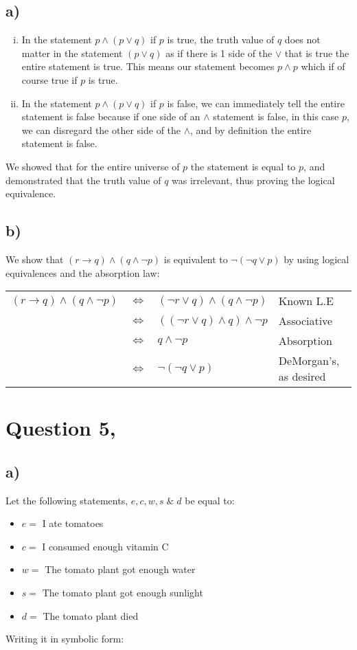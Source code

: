 \documentclass{article}
\begin{document}
\subsection*{a)}
\begin{enumerate}[i)]
    \item In the statement $p \land (p \lor q)$ if $p$ is true, the truth value of $q$ does not matter in the statement $(p\lor q)$ as if there is 1 side of the $\lor$ that is true the entire statement is true. This means our statement becomes $p \land p$ which if of course true if $p$ is true.
    \item In the statement $p \land (p \lor q)$ if $p$ is false, we can immediately tell the entire statement is false because if one side of an $\land$ statement is false, in this case $p$, we can disregard the other side of the $\land$, and by definition the entire statement is false.
\end{enumerate}
We showed that for the entire universe of $p$ the statement is equal to $p$, and demonstrated that the truth value of $q$ was irrelevant, thus proving the logical equivalence. 
\subsection*{b)}
We show that $(r\rightarrow q) \land (q \land \lnot p)$ is equivalent to $\lnot(\lnot q \lor p)$ by using logical equivalences and the absorption law:

\begin{table}[htp]
    \centering
    \begin{tabular}{ccll}
        $(r\rightarrow q) \land (q \land \lnot p)$ & $\Leftrightarrow$ & $(\lnot r\lor q) \land (q \land \lnot p)$ & Known L.E\\
         & $\Leftrightarrow$ &$((\lnot r\lor q) \land q) \land \lnot p$ & Associative\\
         & $\Leftrightarrow$ & $q \land \lnot p$ & Absorption\\
         & $\Leftrightarrow$ & $\lnot(\lnot q \lor p)$ & DeMorgan's, as desired\\
    \end{tabular}
\end{table}
\newpage
\section*{Question 5,}
\subsection*{a)}
Let the following statements, $e,c,w,s\;\& \;d$ be equal to:
\begin{itemize}
    \item $e = $ I ate tomatoes
    \item $c = $ I consumed enough vitamin C
    \item $w = $ The tomato plant got enough water
    \item $s = $ The tomato plant got enough sunlight
    \item $d = $ The tomato plant died
\end{itemize}
Writing it in symbolic form:
\end{document}
